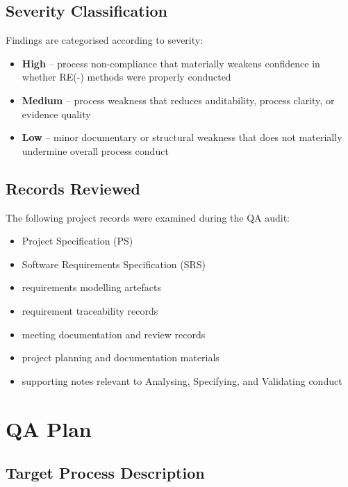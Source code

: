 \documentclass[11pt,a4paper]{article}
\begin{document}
\subsection{Severity Classification}

Findings are categorised according to severity:

\begin{itemize}[leftmargin=*]
\item \textbf{High} -- process non-compliance that materially weakens confidence in whether RE(-) methods were properly conducted
\item \textbf{Medium} -- process weakness that reduces auditability, process clarity, or evidence quality
\item \textbf{Low} -- minor documentary or structural weakness that does not materially undermine overall process conduct
\end{itemize}

\subsection{Records Reviewed}

The following project records were examined during the QA audit:

\begin{itemize}[leftmargin=*]
\item Project Specification (PS)
\item Software Requirements Specification (SRS)
\item requirements modelling artefacts
\item requirement traceability records
\item meeting documentation and review records
\item project planning and documentation materials
\item supporting notes relevant to Analysing, Specifying, and Validating conduct
\end{itemize}


\section{QA Plan}

\subsection{Target Process Description}
\end{document}
